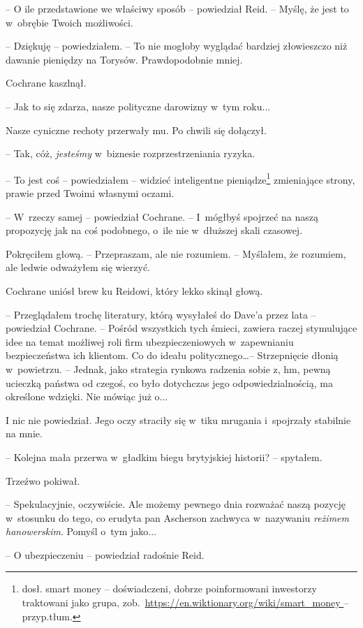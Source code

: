 \documentclass[oneside,polish,11pt,sfheadings]{mwbk}
\begin{document}
-- O ile przedstawione we właściwy sposób -- powiedział Reid. -- Myślę, że
jest to w~obrębie Twoich możliwości.

-- Dziękuję -- powiedziałem. -- To nie mogłoby wyglądać bardziej
złowieszczo niż dawanie pieniędzy na Torysów. Prawdopodobnie mniej.

Cochrane kaszlnął. 

-- Jak to się zdarza, nasze polityczne darowizny w~tym
roku...

Nasze cyniczne rechoty przerwały mu. Po chwili się dołączył.

-- Tak, cóż, \emph{jesteśmy} w~biznesie rozprzestrzeniania ryzyka.

-- To jest coś -- powiedziałem -- widzieć inteligentne pieniądze\footnote{dosł.
smart money -- doświadczeni, dobrze poinformowani inwestorzy traktowani
jako grupa, zob.~\url{https://en.wiktionary.org/wiki/smart_money } -- przyp.tłum.}
zmieniające strony, prawie przed Twoimi własnymi oczami. 

-- W~rzeczy samej -- powiedział Cochrane. -- I~mógłbyś spojrzeć na naszą
propozycję jak na coś podobnego, o~ile nie w~dłuższej skali czasowej.

Pokręciłem głową. -- Przepraszam, ale nie rozumiem. -- Myślałem, że
rozumiem, ale ledwie odważyłem się wierzyć.

Cochrane uniósł brew ku Reidowi, który lekko skinął głową.

-- Przeglądałem trochę literatury, którą wysyłałeś do Dave'a przez lata -- powiedział Cochrane. -- Pośród wszystkich tych śmieci, zawiera raczej
stymulujące idee na temat możliwej roli firm ubezpieczeniowych w~zapewnianiu bezpieczeństwa ich klientom. Co do ideału politycznego\ldots -- Strzepnięcie dłonią w~powietrzu. -- Jednak, jako strategia rynkowa
radzenia sobie z, hm, pewną ucieczką państwa od czegoś, co było
dotychczas jego odpowiedzialnością, ma określone wdzięki. Nie mówiąc już
o...

I nic nie powiedział. Jego oczy straciły się w~tiku mrugania i~spojrzały
stabilnie na mnie.

-- Kolejna mała przerwa w~gładkim biegu brytyjskiej historii? -- spytałem.

Trzeźwo pokiwał. 

-- Spekulacyjnie, oczywiście. Ale możemy pewnego dnia
rozważać naszą pozycję w~stosunku do tego, co erudyta pan Ascherson
zachwyca w~nazywaniu \emph{reżimem hanowerskim}. Pomyśl o~tym jako...

-- O ubezpieczeniu -- powiedział radośnie Reid.
\end{document}
